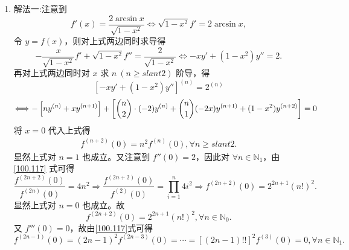 \documentclass[../../main.tex]{subfiles}
\begin{document}
\begin{solution}
\begin{enumerate}[(1)]
\item {\color{blue}解法一:}注意到
\[
f'(x) = \frac{2\arcsin x}{\sqrt{1 - x^2}} \Longleftrightarrow \sqrt{1 - x^2} f' = 2\arcsin x,
\]
令 \( y = f(x) \)，则对上式两边同时求导得
\[
-\frac{x}{\sqrt{1 - x^2}} f' + \sqrt{1 - x^2} f'' = \frac{2}{\sqrt{1 - x^2}} \Longleftrightarrow -x y' + (1 - x^2) y'' = 2.
\]
再对上式两边同时对 \( x \) 求 \( n \ (n \geqslant slant 2) \) 阶导，得
\[
\left[ -x y' + (1 - x^2) y'' \right]^{(n)} = 2^{(n)}
\]
\[
\Longleftrightarrow -\left[ n y^{(n)} + x y^{(n + 1)} \right] + \left[ \dbinom{n}{2} \cdot (-2) y^{(n)} + \dbinom{n}{1} (-2x) y^{(n + 1)} + (1 - x^2) y^{(n + 2)} \right] = 0
\]
将 \( x = 0 \) 代入上式得
\begin{align}\label{100.117}
f^{(n + 2)}(0) = n^2 f^{(n)}(0), \forall n \geqslant slant 2. 
\end{align}
显然上式对 \( n = 1 \) 也成立。又注意到 \( f''(0) = 2 \)，因此对 \( \forall n \in \mathbb{N}_1 \)，由\eqref{100.117} 式可得
\[
\frac{f^{(2n + 2)}(0)}{f^{(2n)}(0)} = 4n^2 \Rightarrow \frac{f^{(2n + 2)}(0)}{f^{(2)}(0)} = \prod_{i = 1}^n 4i^2 \Rightarrow f^{(2n + 2)}(0) = 2^{2n + 1} (n!)^2.
\]
显然上式对 \( n = 0 \) 也成立。故
\[
f^{(2n + 2)}(0) = 2^{2n + 1} (n!)^2, \forall n \in \mathbb{N}_0.
\]
又 \( f'''(0) = 0 \)，故由\eqref{100.117}式可得
\[
f^{(2n - 1)}(0) = (2n - 1)^2 f^{(2n - 3)}(0) = \cdots = \left[ (2n - 1)!! \right]^2 f^{(3)}(0) = 0, \forall n \in \mathbb{N}_1.
\]


\end{enumerate}
\end{solution}
\end{document}
